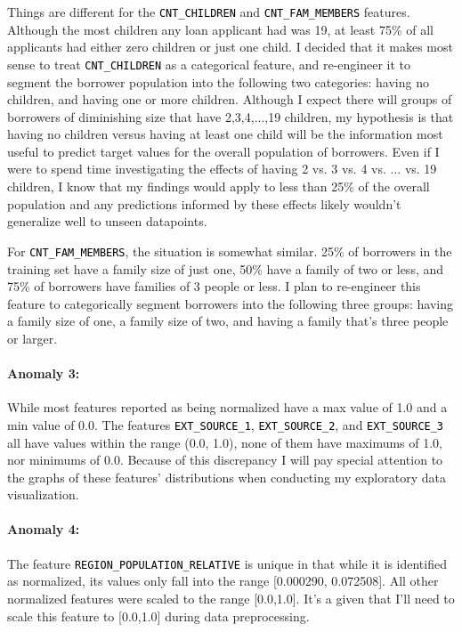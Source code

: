 \documentclass[12pt, letterpaper]{article}
\begin{document}
Things are different for the \colorbox{backcolor}{\textcolor{black}{\texttt{CNT_CHILDREN}}} and \colorbox{backcolor}{\textcolor{black}{\texttt{CNT_FAM_MEMBERS}}} features. Although the most children any loan applicant had was 19, at least 75\% of all applicants had either zero children or just one child. I decided that it makes most sense to treat  \colorbox{backcolor}{\textcolor{black}{\texttt{CNT_CHILDREN}}} as a categorical feature, and re-engineer it to segment the borrower population into the following two categories: having no children, and having one or more children. Although I expect there will groups of borrowers of diminishing size that have 2,3,4,...,19 children, my hypothesis is that having no children versus having at least one child will be the information most useful to predict target values for the overall population of borrowers. Even if I were to spend time investigating the effects of having 2 vs. 3 vs. 4 vs. ... vs. 19 children, I know that my findings would apply to less than 25\% of the overall population and any predictions informed by these effects likely wouldn't generalize well to unseen datapoints.

For \colorbox{backcolor}{\textcolor{black}{\texttt{CNT_FAM_MEMBERS}}}, the situation is somewhat similar. 25\% of borrowers in the training set have a family size of just one, 50\% have a family of two or less, and 75\% of borrowers have families of 3 people or less. I plan to re-engineer this feature to categorically segment borrowers into the following three groups: having a family size of one, a family size of two, and having a family that's three people or larger.

\paragraph{Anomaly 3:}
While most features reported as being normalized have a max value of 1.0 and a min value of 0.0. The features \colorbox{backcolor}{\textcolor{black}{\texttt{EXT_SOURCE_1}}}, \colorbox{backcolor}{\textcolor{black}{\texttt{EXT_SOURCE_2}}}, and \colorbox{backcolor}{\textcolor{black}{\texttt{EXT_SOURCE_3}}} all have values within the range (0.0, 1.0), none of them have maximums of 1.0, nor minimums of 0.0. Because of this discrepancy I will pay special attention to the graphs of these features' distributions when conducting my exploratory data visualization.

\paragraph{Anomaly 4:}
The feature \colorbox{backcolor}{\textcolor{black}{\texttt{REGION_POPULATION_RELATIVE}}} is unique in that while it is identified as normalized, its values only fall into the range [0.000290, 0.072508]. All other normalized features were scaled to the range [0.0,1.0]. It's a given that I'll need to scale this feature to [0.0,1.0] during data preprocessing.
\end{document}

